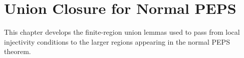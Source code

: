 
\chapter{Union Closure for Normal PEPS}%
\label{ch:peps_normal_union}

This chapter develops the finite-region union lemmas used to pass from local
injectivity conditions to the larger regions appearing in the normal PEPS
theorem.


